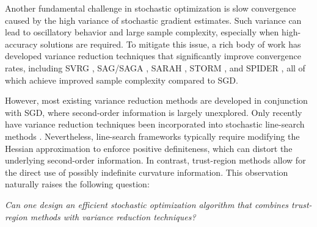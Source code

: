 \documentclass{article}
\theoremstyle{plain}
\theoremstyle{definition}
\theoremstyle{remark}
\begin{document}
Another fundamental challenge in stochastic optimization is slow convergence caused by the high variance of stochastic gradient estimates. Such variance can lead to oscillatory behavior and large sample complexity, especially when high-accuracy solutions are required. To mitigate this issue, a rich body of work has developed variance reduction techniques that significantly improve convergence rates, including SVRG \citep{Johnson2013Accelerating}, SAG/SAGA \citep{Roux2012Stochastic,Defazio2014Saga}, SARAH \citep{Nguyen2017Sarah}, STORM \citep{Cutkosky2019Momentum}, and SPIDER \citep{Fang2018Spider}, all of which achieve improved sample complexity compared to SGD.

However, most existing variance reduction methods are developed in conjunction with SGD, where second-order information is largely unexplored. Only recently have variance reduction techniques been incorporated into stochastic line-search methods \citep{Berahas2023Accelerating}. Nevertheless, line-search frameworks typically require modifying the Hessian approximation to enforce positive definiteness, which can distort the underlying second-order information. In contrast, trust-region methods allow for the direct use of possibly indefinite curvature information. This observation naturally raises the following question:
\begin{center}
\textit{Can one design an efficient stochastic optimization algorithm that combines trust-region methods with variance reduction techniques?}
\end{center}
\end{document}
